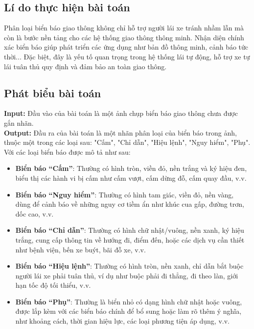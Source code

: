 \documentclass[a4paper,12pt]{article}
\begin{document}
\subsection{Lí do thực hiện bài toán}
\hspace{5mm}Phân loại biển báo giao thông không chỉ hỗ trợ người lái xe tránh nhầm lẫn mà còn là bước nền tảng cho các hệ thống giao thông thông minh. Nhận diện chính xác biển báo giúp phát triển các ứng dụng như bản đồ thông minh, cảnh báo tức thời... Đặc biệt, đây là yếu tố quan trọng trong hệ thống lái tự động, hỗ trợ xe tự lái tuân thủ quy định và đảm bảo an toàn giao thông.

\subsection{Phát biểu bài toán}
\textbf{Input:} Đầu vào của bài toán là một ảnh chụp biển báo giao thông chưa được gắn nhãn.\\[0.2cm]
\textbf{Output:} Đầu ra của bài toán là một nhãn phân loại của biển báo trong ảnh, thuộc một trong các loại sau: "Cấm", "Chỉ dẫn", "Hiệu lệnh", "Nguy hiểm", "Phụ".\\[0.2cm]
Với các loại biển báo được mô tả như sau:
\begin{itemize}
    \item \textbf{Biển báo “Cấm”}: Thường có hình tròn, viền đỏ, nền trắng và ký hiệu đen, biểu thị các hành vi bị cấm như cấm vượt, cấm dừng đỗ, cấm quay đầu, v.v.
    \item \textbf{Biển báo “Nguy hiểm”}: Thường có hình tam giác, viền đỏ, nền vàng, dùng để cảnh báo về những nguy cơ tiềm ẩn như khúc cua gấp, đường trơn, dốc cao, v.v.
    \item \textbf{Biển báo “Chỉ dẫn”}: Thường có hình chữ nhật/vuông, nền xanh, ký hiệu trắng, cung cấp thông tin về hướng đi, điểm đến, hoặc các dịch vụ cần thiết như bệnh viện, bến xe buýt, bãi đỗ xe, v.v.
    \item \textbf{Biển báo “Hiệu lệnh”}: Thường có hình tròn, nền xanh, chỉ dẫn bắt buộc người lái xe phải tuân thủ, ví dụ như buộc phải đi thẳng, đi theo làn, giới hạn tốc độ tối thiểu, v.v.
    \item \textbf{Biển báo “Phụ”}: Thường là biển nhỏ có dạng hình chữ nhật hoặc vuông, được lắp kèm với các biển báo chính để bổ sung hoặc làm rõ thêm ý nghĩa, như khoảng cách, thời gian hiệu lực, các loại phương tiện áp dụng, v.v.
\end{itemize}
\end{document}
